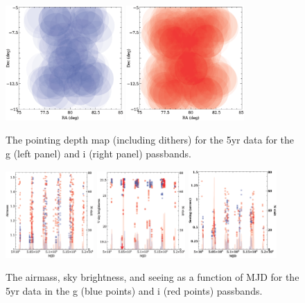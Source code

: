 \documentclass[12pt]{article}
\begin{document}
\begin{figure}
\centerline{
\includegraphics[width=0.4\textwidth]{Figures/depth_g.eps}\hfil
\includegraphics[width=0.4\textwidth]{Figures/depth_i.eps}
}
\caption{The pointing depth map (including dithers) for the 5yr data for the g (left panel)
 and i (right panel)  passbands.}
\label{depth}
\end{figure}


\begin{figure}
\centerline{
\includegraphics[width=0.3\textwidth]{Figures/airmass_mjd.eps}\hfil
\includegraphics[width=0.3\textwidth]{Figures/sky_mjd.eps}\hfil
\includegraphics[width=0.3\textwidth]{Figures/seeing.eps}
}
\caption{The airmass, sky brightness, and seeing as a function of MJD for the
  5yr data in the g (blue points) and i (red points) passbands.}
\label{airmass}
\end{figure}
\end{document}
